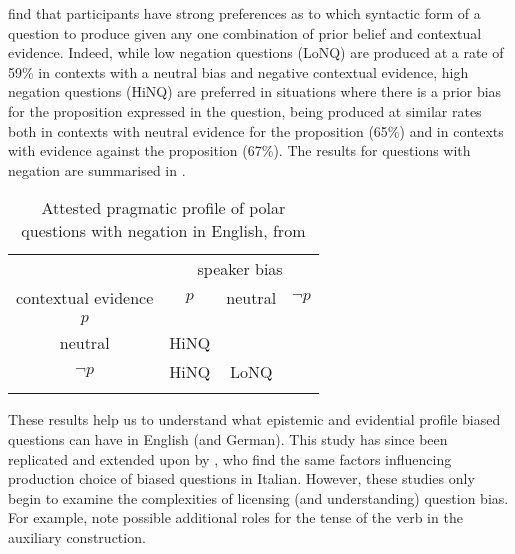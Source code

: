 \documentclass[output=paper,colorlinks,citecolor=brown]{langscibook}
\begin{document}
\citet{domaneschi_bias_2017} find that participants have strong preferences as to which syntactic form of a question to produce given any one combination of prior belief and contextual evidence. Indeed, while low negation questions (LoNQ) are produced at a rate of 59\% in contexts with a neutral bias and negative contextual evidence, high negation questions (HiNQ) are preferred in situations where there is a prior bias for the proposition expressed in the question, being produced at similar rates both in contexts with neutral evidence for the proposition (65\%) and in contexts with evidence against the proposition (67\%). The results for questions with negation are summarised in .

\begin{table}
\begin{tabular}{c  ccc}
\lsptoprule
                      & \multicolumn{3}{c}{{speaker bias}} \\\cmidrule(lr){2-4}
contextual evidence   & $p$          & neutral        & $\neg p$  \\ \midrule
$p$                   &              &                &           \\
neutral               & HiNQ         &                &           \\
$\neg p$              & HiNQ         & LoNQ           &           \\
\lspbottomrule
\end{tabular}
\caption{Attested pragmatic profile of polar questions with negation in English, from \citet{domaneschi_bias_2017}}
\label{tab1}
\end{table}

These results help us to understand what epistemic and evidential profile biased questions can have in English (and German). This study has since been replicated and extended upon by \citet{maro2021}, who find the same factors influencing production choice of biased questions in Italian. However, these studies only begin to examine the complexities of licensing (and understanding) question bias. For example, \citet{maro2021} note possible additional roles for the tense of the verb in the auxiliary construction.
\end{document}
